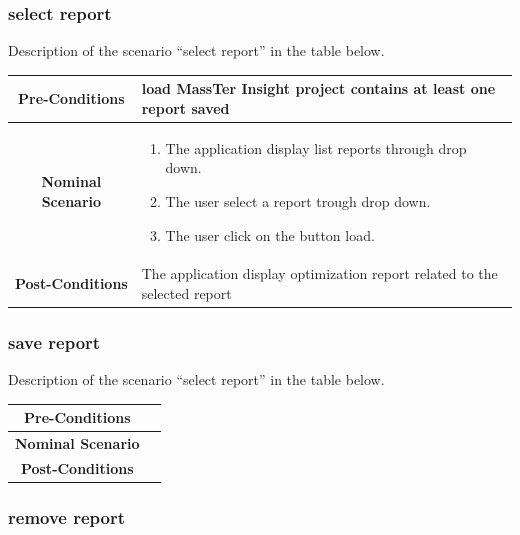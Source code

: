 \documentclass[12pt]{article}
\begin{document}
 \clearpage
 \newpage
 
 	 \subsubsection{select report}

 Description of the scenario ``select report'' in the table below.
 
 \begin{table}
 	\centering
 	\begin{tabular}{|c|p{10cm}|}
 		\hline 	
 		\textbf{Pre-Conditions } & load MassTer Insight project contains at least one report saved\\ 
 		\hline                     
 		\textbf{Nominal Scenario } &
 		\begin{enumerate}
 			\item The application display list reports through drop down.
 			\item The user select a report trough drop down.
 			\item The user click on the button load.   
 		\end{enumerate} \\ 
 		\hline 
 		\textbf{Post-Conditions} & The application display optimization report related to the selected report \\
 		\hline 
 	\end{tabular}
 \end{table}
 \clearpage
 \newpage
  	 \subsubsection{save report}
 
 Description of the scenario ``select report'' in the table below.
 
 \begin{table}
 	\centering
 	\begin{tabular}{|c|p{10cm}|}
 		\hline 	
 		\textbf{Pre-Conditions } & \\ 
 		\hline                     
 		\textbf{Nominal Scenario } & \\ 
 		\hline 
 		\textbf{Post-Conditions} &  \\
 		\hline 
 	\end{tabular}
 \end{table}
 \clearpage
 \newpage
   	 \subsubsection{remove report}
 
\end{document}
